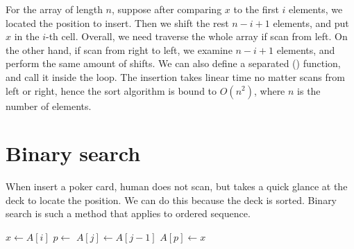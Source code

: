 \documentclass[b5paper]{article}
\begin{document}
For the array of length $n$, suppose after comparing $x$ to the first $i$ elements, we located the position to insert. Then we shift the rest $n - i + 1$ elements, and put $x$ in the $i$-th cell. Overall, we need traverse the whole array if scan from left. On the other hand, if scan from right to left, we examine $n - i + 1$ elements, and perform the same amount of shifts. We can also define a separated () function, and call it inside the loop. The insertion takes linear time no matter scans from left or right, hence the sort algorithm is bound to $O(n^2)$, where $n$ is the number of elements.

\begin{Exercise}\label{ex:isort-insert}
\end{Exercise}

\begin{Answer}[ref = {ex:isort-insert}]
\end{Answer}

\section{Binary search}

When insert a poker card, human does not scan, but takes a quick glance at the deck to locate the position. We can do this because the deck is sorted. Binary search is such a method that applies to ordered sequence.

\begin{algorithmic}[1]
    \State $x \gets A[i]$
    \State $p \gets $ 
      \State $A[j] \gets A[j-1]$
    \EndFor
    \State $A[p] \gets x$
  \EndFor
\EndFunction
\end{algorithmic}
\end{document}
